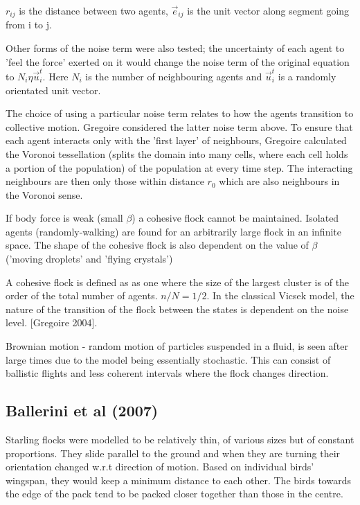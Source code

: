 \documentclass[10pt,twocolumn]{revtex4-2}    %
\begin{document}
$r_{ij}$ is the distance between two agents, $\vec{e}_{ij}$ is the unit vector along segment going from i to j.

Other forms of the noise term were also tested; the uncertainty of each agent to 'feel the force' exerted on it would change the noise term of the original equation to $N_i \eta \vec{u}_i^t$. Here $N_i$ is the number of neighbouring agents and $\vec{u}_i^t$ is a randomly orientated unit vector. 

The choice of using a particular noise term relates to how the agents transition to collective motion. Gregoire considered the latter noise term above. To ensure that each agent interacts only with the 'first layer' of neighbours, Gregoire calculated the Voronoi tessellation (splits the domain into many cells, where each cell holds a portion of the population) of the population at every time step. The interacting neighbours are then only those within distance $r_0$ which are also neighbours in the Voronoi sense. 

If body force is weak (small $\beta$) a cohesive flock cannot be maintained. Isolated agents (randomly-walking) are found for an arbitrarily large flock in an infinite space. The shape of the cohesive flock is also dependent on the value of $\beta$ ('moving droplets' and 'flying crystals')

A cohesive flock is defined as as one where the size of the largest cluster is of the order of the total number of agents. $n/N=1/2$. In the classical Vicsek model, the nature of the transition of the flock between the states is dependent on the noise level. [Gregoire 2004]. 

Brownian motion - random motion of particles suspended in a fluid, is seen after large times due to the model being essentially stochastic. This can consist of ballistic flights and less coherent intervals where the flock changes direction.






\subsection{Ballerini et al (2007)}

Starling flocks were modelled to be relatively thin, of various sizes but of constant proportions. They slide parallel to the ground and when they are turning their orientation changed w.r.t direction of motion. Based on individual birds' wingspan, they would keep a minimum distance to each other. The birds towards the edge of the pack tend to be packed closer together than those in the centre. 
\end{document}

